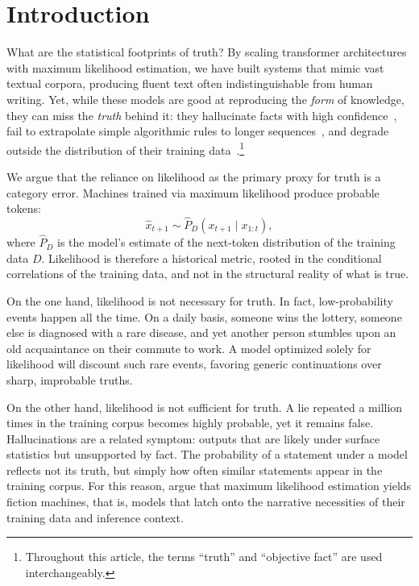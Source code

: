 \section{Introduction}

What are the statistical footprints of truth? By scaling transformer architectures with maximum likelihood estimation, we have built systems that mimic vast textual corpora, producing fluent text often indistinguishable from human writing. Yet, while these models are good at reproducing the \emph{form} of knowledge, they can miss the \emph{truth} behind it: they hallucinate facts with high confidence~\citep{kalai2025}, fail to extrapolate simple algorithmic rules to longer sequences~\citep{kartikcot}, and degrade outside the distribution of their training data~\citep{yuan2023revisiting}.\footnote{Throughout this article, the terms ``truth'' and ``objective fact'' are used interchangeably.}

We argue that the reliance on likelihood as the primary proxy for truth is a category error. Machines trained via maximum likelihood produce probable tokens:
\begin{equation*}
    \hat{x}_{t+1} \sim \hat{P}_D(x_{t+1} \mid x_{1:t}),
\end{equation*}
where $\hat{P}_D$ is the model's estimate of the next-token distribution of the training data $D$. Likelihood is therefore a historical metric, rooted in the conditional correlations of the training data, and not in the structural reality of what is true.

On the one hand, likelihood is not necessary for truth. In fact, low-probability events happen all the time. On a daily basis, someone wins the lottery, someone else is diagnosed with a rare disease, and yet another person stumbles upon an old acquaintance on their commute to work. A model optimized solely for likelihood will discount such rare events, favoring generic continuations over sharp, improbable truths.

On the other hand, likelihood is not sufficient for truth. A lie repeated a million times in the training corpus becomes highly probable, yet it remains false. Hallucinations are a related symptom: outputs that are likely under surface statistics but unsupported by fact. The probability of a statement under a model reflects not its truth, but simply how often similar statements appear in the training corpus. For this reason, \citet{fiction} argue that maximum likelihood estimation yields fiction machines, that is, models that latch onto the narrative necessities of their training data and inference context.

